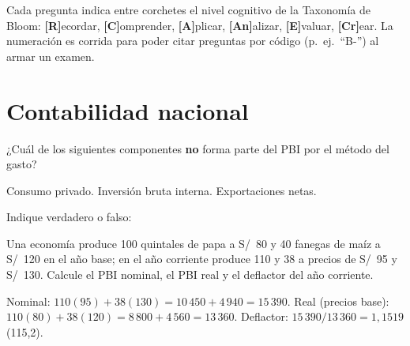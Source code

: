 \documentclass[claves]{evaluacion}
\begin{document}

\begin{instrucciones}
Cada pregunta indica entre corchetes el nivel cognitivo de la Taxonomía
de Bloom: \textbf{[R]}ecordar, \textbf{[C]}omprender, \textbf{[A]}plicar,
\textbf{[An]}alizar, \textbf{[E]}valuar, \textbf{[Cr]}ear. La numeración
es corrida para poder citar preguntas por código
(p.~ej.\ \enquote{B-\thepregunta}) al armar un examen.
\end{instrucciones}

\section{Contabilidad nacional}

\begin{pregunta}
¿Cuál de los siguientes componentes \textbf{no} forma parte del PBI por
el método del gasto?
\begin{opciones}
  \opcion Consumo privado.
  \opcion Inversión bruta interna.
  \opcion {}
  \opcion Exportaciones netas.
\end{opciones}
\end{pregunta}

\begin{pregunta}
Indique verdadero o falso:
\begin{tablavf}
\end{tablavf}
\end{pregunta}

\begin{pregunta}[][A · Cálculo]
Una economía produce 100 quintales de papa a S/~80 y 40 fanegas de maíz a
S/~120 en el año base; en el año corriente produce 110 y 38 a precios de
S/~95 y S/~130. Calcule el PBI nominal, el PBI real y el deflactor del
año corriente.
\begin{solucion}
Nominal: $110(95)+38(130) = 10\,450 + 4\,940 = 15\,390$.
Real (precios base): $110(80)+38(120) = 8\,800+4\,560 = 13\,360$.
Deflactor: $15\,390/13\,360 = 1{,}1519$ (115,2).
\end{solucion}
\end{pregunta}
\end{document}
